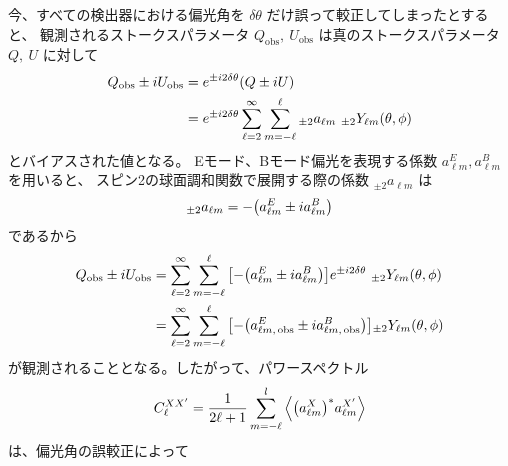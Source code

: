 \documentclass[../../main.tex]{subfiles}
\begin{document}
今、すべての検出器における偏光角を $\delta \theta$ だけ誤って較正してしまったとすると、
観測されるストークスパラメータ $Q_{\mathrm{obs}},\ U_{\mathrm{obs}}$ は真のストークスパラメータ $Q,\ U$ に対して
\begin{align}
    Q_{\mathrm{obs}} \pm iU_{\mathrm{obs}} &= e^{\pm i2\delta\theta}\qty(Q \pm iU) \\
    &= e^{\pm i2\delta\theta}\sum_{\ell=2}^{\infty}\sum_{m=-\ell}^{\ell} {}_{\pm 2}a_{\ell m}\ {}_{\pm 2}Y_{\ell m}(\theta, \phi)
\end{align}
とバイアスされた値となる\cite{so:Keating_2013}\cite{so:Kaufman_2014}。
Eモード、Bモード偏光を表現する係数 $a_{\ell m}^{E}, a_{\ell m}^{B}$ を用いると、
スピン2の球面調和関数で展開する際の係数 ${}_{\pm 2}a_{\ell m}$ は
\begin{equation}
    {}_{\pm 2}a_{\ell m} = -\qty(a_{\ell m}^{E} \pm i a_{\ell m}^{B})
\end{equation}
であるから
\begin{align}
    Q_{\mathrm{obs}} \pm iU_{\mathrm{obs}} &= \sum_{\ell=2}^{\infty}\sum_{m=-\ell}^{\ell} \qty[-\qty(a_{\ell m}^{E} \pm i a_{\ell m}^{B})]e^{\pm i2\delta\theta}\ {}_{\pm 2}Y_{\ell m}(\theta, \phi) \\
    &= \sum_{\ell=2}^{\infty}\sum_{m=-\ell}^{\ell} \qty[-\qty(a_{\ell m,\,\mathrm{obs}}^{E} \pm i a_{\ell m,\,\mathrm{obs}}^{B})] {}_{\pm2}Y_{\ell m}(\theta, \phi)
\end{align}
が観測されることとなる。したがって、パワースペクトル
\begin{equation}
    C_{\ell}^{XX'} = \dfrac{1}{2\ell+1}\sum_{m=-\ell}^{l}\left\langle \qty(a_{\ell m}^{X})^{*} a_{\ell m}^{X'} \right\rangle
\end{equation}
は、偏光角の誤較正によって
\end{document}
